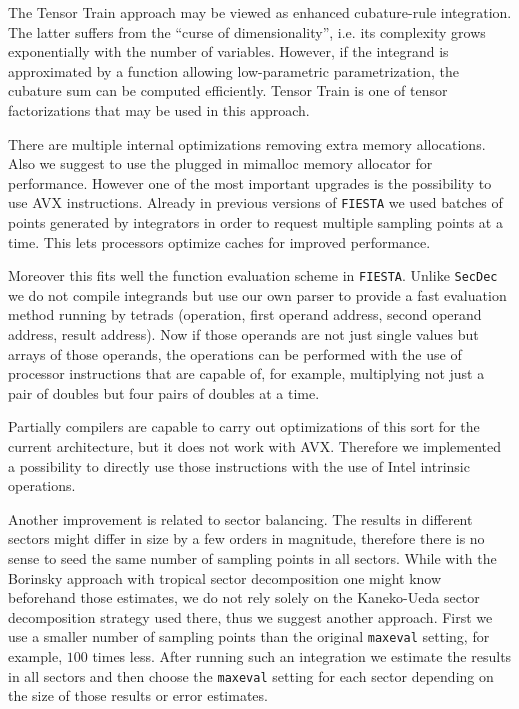\documentclass[preprint,12pt]{elsarticle}
\begin{document}
The Tensor Train approach may be viewed as enhanced cubature-rule integration. The latter suffers from the ``curse of dimensionality'', i.e. its complexity grows exponentially with the number of variables. However, if the integrand is approximated by a function allowing low-parametric parametrization, the cubature sum can be computed efficiently. Tensor Train is one of tensor factorizations that may be used in this approach.

There are multiple internal optimizations removing extra memory allocations. Also we suggest to use the plugged in mimalloc memory allocator for performance. However one of the most important upgrades is the possibility to use AVX instructions. Already in previous versions of {\tt FIESTA} we used batches of points generated by integrators in order to request multiple sampling points at a time. This lets processors optimize caches for improved performance. 

Moreover this fits well the function evaluation scheme in {\tt FIESTA}. Unlike {\tt SecDec} we do not compile integrands but use our own parser to provide a fast evaluation method running by tetrads (operation, first operand address, second operand address, result address). Now if those operands are not just single values but arrays of those operands, the operations can be performed with the use of processor instructions that are capable of, for example, multiplying not just a pair of doubles but four pairs of doubles at a time. 

Partially compilers are capable to carry out optimizations of this sort for the current architecture, but it does not work with AVX. Therefore we implemented a possibility to directly use those instructions with the use of Intel intrinsic operations.

Another improvement is related to sector balancing. The results in different sectors might differ in size by a few orders in magnitude, therefore there is no sense to seed the same number of sampling points in all sectors. While with the Borinsky approach with tropical sector decomposition one might know beforehand those estimates, we do not rely solely on the Kaneko-Ueda sector decomposition strategy used there, thus we suggest another approach. First we use a smaller number of sampling points than the original {\tt maxeval} setting, for example, $100$ times less. After running such an integration we estimate the results in all sectors and then choose the {\tt maxeval} setting for each sector depending on the size of those results or error estimates.
\end{document}
